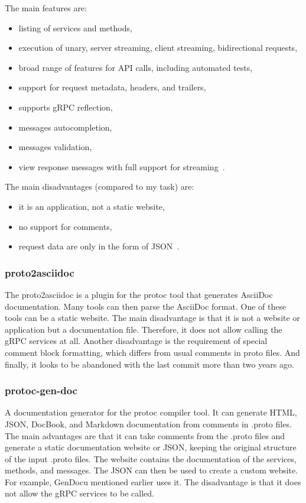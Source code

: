The main features are:
\begin{itemize}
    \item listing of services and methods,
    \item execution of unary, server streaming, client streaming, bidirectional requests,
    \item broad range of features for API calls, including automated tests,
    \item support for request metadata, headers, and trailers,
    \item supports gRPC reflection,
    \item messages autocompletion,
    \item messages validation,
    \item view response messages with full support for streaming~\cite{postman}.
\end{itemize}

The main disadvantages (compared to my task) are:
\begin{itemize}
    \item it is an application, not a static website,
    \item no support for comments,
    \item request data are only in the form of JSON~\cite{postman}.
\end{itemize}

\subsubsection{proto2asciidoc}
The proto2asciidoc is a plugin for the protoc tool that generates AsciiDoc documentation.
Many tools can then parse the AsciiDoc format.
One of these tools can be a static website.
The main disadvantage is that it is not a website or application but a documentation file.
Therefore, it does not allow calling the gRPC services at all.
Another disadvantage is the requirement of special comment block formatting, which differs from usual comments in proto files.
And finally, it looks to be abandoned with the last commit more than two years ago.
\cite{grpc-proto2asciidoc}

\subsubsection{protoc-gen-doc}
A documentation generator for the protoc compiler tool.
It can generate HTML, JSON, DocBook, and Markdown documentation from comments in .proto files.
The main advantages are that it can take comments from the .proto files and generate a static documentation website or JSON, keeping the original structure of the input .proto files.
The website contains the documentation of the services, methods, and messages.
The JSON can then be used to create a custom website. For example, GenDocu mentioned earlier uses it.
The disadvantage is that it does not allow the gRPC services to be called.
\cite{grpc-protoc-gen-doc}


